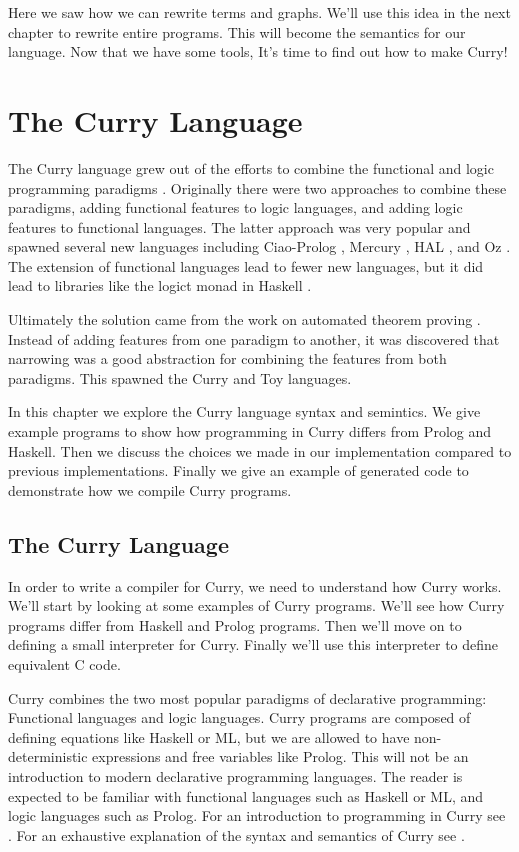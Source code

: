 \documentclass{book}
\theoremstyle{definition}
\begin{document}
Here we saw how we can rewrite terms and graphs.
We'll use this idea in the next chapter to rewrite entire programs.
This will become the semantics for our language.
Now that we have some tools, It's time to find out how to make Curry!


\chapter{The Curry Language} \label{ch:The Curry Language}


The Curry language grew out of the efforts to combine the functional and 
logic programming paradigms \cite{multiparadigm}.
Originally there were two approaches to combine these paradigms,
adding functional features to logic languages,
and adding logic features to functional languages.
The latter approach was very popular and spawned several new languages
including Ciao-Prolog \cite{ciao}, Mercury \cite{mercury}, HAL \cite{hal}, and Oz \cite{oz}.
The extension of functional languages lead to fewer new languages,
but it did lead to libraries like the logict monad in Haskell \cite{logict}.

Ultimately the solution came from the work on automated theorem proving \cite{narrowing}.
Instead of adding features from one paradigm to another,
it was discovered that narrowing was a good abstraction for combining 
the features from both paradigms.
This spawned the Curry \cite{IntegrationFunLog} and Toy \cite{toy} languages.

In this chapter we explore the Curry language syntax and semintics.
We give example programs to show how programming in Curry differs from Prolog and Haskell.
Then we discuss the choices we made in our implementation compared to previous implementations.
Finally we give an example of generated code to demonstrate how we compile Curry programs.

\section{The Curry Language} \label{The Curry Language}

In order to write a compiler for Curry, we need to understand how Curry works.
We'll start by looking at some examples of Curry programs.
We'll see how Curry programs differ from Haskell and Prolog programs.
Then we'll move on to defining a small interpreter for Curry.
Finally we'll use this interpreter to define equivalent C code.

Curry combines the two most popular paradigms of declarative programming:
Functional languages and logic languages.
Curry programs are composed of defining equations like Haskell or ML,
but we are allowed to have non-deterministic expressions and free variables like Prolog.
This will not be an introduction to modern declarative programming languages.
The reader is expected to be familiar with functional languages such as Haskell or ML,
and logic languages such as Prolog.
For an introduction to programming in Curry see \cite{CurryTutorial}.
For an exhaustive explanation of the syntax and semantics of Curry see \cite{CurryReport}.
\end{document}

